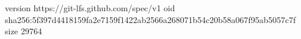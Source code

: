 version https://git-lfs.github.com/spec/v1
oid sha256:5f397d4418159fa2e7159f1422ab2566a268071b54c20b58a067f95ab5057c7f
size 29764
